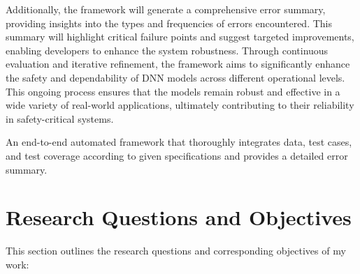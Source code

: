 Additionally, the framework will generate a comprehensive error summary, providing insights into the types and frequencies of errors encountered. This summary will highlight critical failure points and suggest targeted improvements, enabling developers to enhance the system robustness.
Through continuous evaluation and iterative refinement, the framework aims to significantly enhance the safety and dependability of DNN models across different operational levels. This ongoing process ensures that the models remain robust and effective in a wide variety of real-world applications, ultimately contributing to their reliability in safety-critical systems.

\begin{tcolorbox}[colback=purple!2!white, colframe=purple,title= Thesis Goal]
   An end-to-end automated framework that thoroughly integrates data, test cases, and test coverage according to given specifications and provides a detailed error summary.
\end{tcolorbox}

\section{Research Questions and Objectives}
\label{Research Questions and Objectives}
This section outlines the research questions and corresponding objectives of my work:

